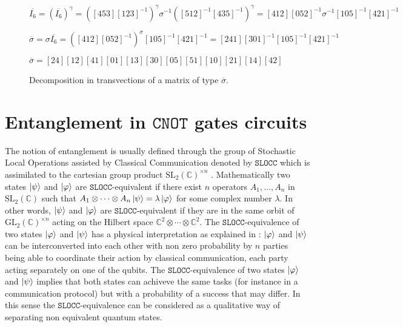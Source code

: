 \documentclass[a4paper,12pt,fleqn]{article}
\newcommand\SLOCC{\mathtt{SLOCC}}
\newcommand\cnot{\mathtt{CNOT}}
\newcommand\C{\mathbb{C}}
\renewcommand\phi{\varphi}
\begin{document}
\begin{figure}
    $\overline{I_6}=(\overline{I_6})^{\gamma}=([453][123]^{-1})^{\gamma}\sigma^{-1}([512]^{-1}[435]^{-1})^{\gamma}=
    [412][052]^{-1}\sigma^{-1}[105]^{-1}[421]^{-1}$

    $\overline{\sigma}=\sigma\overline{I_6}=([412][052]^{-1})^{\sigma}[105]^{-1}[421]^{-1}=[241][301]^{-1}[105]^{-1}[421]^{-1}$

     $\overline{\sigma}=[24][12][41][01][13][30][05][51][10][21][14][42]$
    
    { \caption{ Decomposition in transvections of a matrix of type $\overline{\sigma}$.\label{sigmabarex}}}
    \end{figure}
    \clearpage

    \section{Entanglement in $\cnot$ gates circuits}\label{entanglement}
    The notion of entanglement is usually defined through the group of Stochastic Local Operations assisted
    by Classical Communication denoted by $\SLOCC$ which is assimilated to the cartesian group product $\mathrm{SL}_2(\C)^{\times n}$ \cite{2004Miyake,2000DVC}. 
    Mathematically two states $\ket{\psi}$ and $\ket{\phi}$ are $\SLOCC$-equivalent if there exist $n$ operators $ A_{1}, \dots, A_{n}$ in $\mathrm{SL}_2(\C)$
    such that
    $A_{1}\otimes\cdots\otimes A_{n}\ket{\psi}=\lambda \ket{\phi}$ for some complex number $\lambda$. In other words, $\ket{\psi}$ and $\ket{\phi}$ are $\SLOCC$-equivalent if they are in the same orbit of $\mathrm{GL}_2(\C)^{\times n}$ acting on the Hilbert space $\C^{2}\otimes\cdots\otimes\C^{2}$. The $\SLOCC$-equivalence of two states $\ket{\phi}$ and $\ket{\psi}$ has a physical interpretation as explained in \cite{2000DVC} : $\ket{\phi}$ and $\ket{\psi}$ can be interconverted into each other with non zero probability by $n$ parties being able to coordinate their action by classical communication,  each party acting separately  on one of the qubits.
    The $\SLOCC$-equivalence of two states $\ket{\phi}$ and $\ket{\psi}$ implies that both states can achiveve the same tasks (for instance in a communication protocol) but with a probability of a success that may differ. In this sense the $\SLOCC$-equivalence can be considered as a qualitative
    way of separating non equivalent quantum states.    
\medskip    
\end{document}
